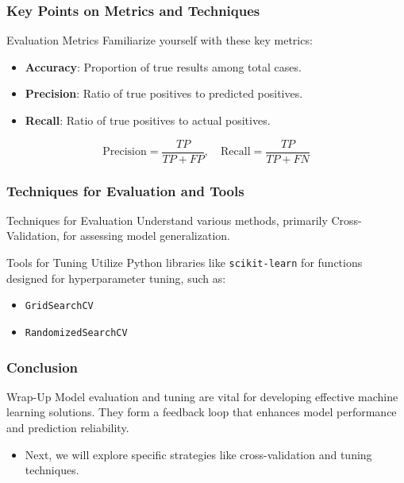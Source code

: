 \documentclass[aspectratio=169]{beamer}
\begin{document}
\begin{frame}[fragile]
    \frametitle{Key Points on Metrics and Techniques}
    \begin{block}{Evaluation Metrics}
        Familiarize yourself with these key metrics:
        \begin{itemize}
            \item \textbf{Accuracy}: Proportion of true results among total cases.
            \item \textbf{Precision}: Ratio of true positives to predicted positives.
            \item \textbf{Recall}: Ratio of true positives to actual positives.
        \end{itemize}
    \end{block}
    \begin{equation}
      \text{Precision} = \frac{TP}{TP + FP}, \quad \text{Recall} = \frac{TP}{TP + FN}
    \end{equation}
\end{frame}

\begin{frame}[fragile]
    \frametitle{Techniques for Evaluation and Tools}
    \begin{block}{Techniques for Evaluation}
        Understand various methods, primarily Cross-Validation, for assessing model generalization.
    \end{block}
    \begin{block}{Tools for Tuning}
        Utilize Python libraries like \texttt{scikit-learn} for functions designed for hyperparameter tuning, such as:
        \begin{itemize}
            \item \texttt{GridSearchCV}
            \item \texttt{RandomizedSearchCV}
        \end{itemize}
    \end{block}
\end{frame}

\begin{frame}[fragile]
    \frametitle{Conclusion}
    \begin{block}{Wrap-Up}
        Model evaluation and tuning are vital for developing effective machine learning solutions. They form a feedback loop that enhances model performance and prediction reliability.
    \end{block}
    \begin{itemize}
        \item Next, we will explore specific strategies like cross-validation and tuning techniques.
    \end{itemize}
\end{frame}
\end{document}
